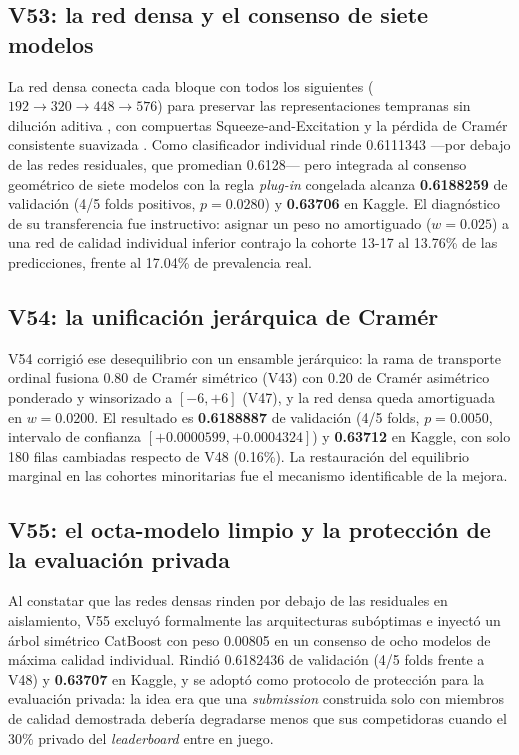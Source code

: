\documentclass[journal]{IEEEtai}
\begin{document}
\subsection{V53: la red densa y el consenso de siete modelos}

La red densa conecta cada bloque con todos los siguientes ($192 \to 320 \to 448 \to 576$) para preservar las representaciones tempranas sin diluci\'on aditiva \cite{huang2017}, con compuertas Squeeze-and-Excitation \cite{hu2018} y la p\'erdida de Cram\'er consistente suavizada \cite{cramer1928,szekely2013}. Como clasificador individual rinde 0.6111343 ---por debajo de las redes residuales, que promedian 0.6128--- pero integrada al consenso geom\'etrico de siete modelos con la regla \textit{plug-in} congelada alcanza \textbf{0.6188259} de validaci\'on (4/5 folds positivos, $p = 0.0280$) y \textbf{0.63706} en Kaggle. El diagn\'ostico de su transferencia fue instructivo: asignar un peso no amortiguado ($w = 0.025$) a una red de calidad individual inferior contrajo la cohorte 13-17 al 13.76\% de las predicciones, frente al 17.04\% de prevalencia real.

\subsection{V54: la unificaci\'on jer\'arquica de Cram\'er}

V54 corrigi\'o ese desequilibrio con un ensamble jer\'arquico: la rama de transporte ordinal fusiona 0.80 de Cram\'er sim\'etrico (V43) con 0.20 de Cram\'er asim\'etrico ponderado y winsorizado a $[-6, +6]$ (V47), y la red densa queda amortiguada en $w = 0.0200$. El resultado es \textbf{0.6188887} de validaci\'on (4/5 folds, $p = 0.0050$, intervalo de confianza $[+0.0000599, +0.0004324]$) y \textbf{0.63712} en Kaggle, con solo 180 filas cambiadas respecto de V48 (0.16\%). La restauraci\'on del equilibrio marginal en las cohortes minoritarias fue el mecanismo identificable de la mejora.

\subsection{V55: el octa-modelo limpio y la protecci\'on de la evaluaci\'on privada}

Al constatar que las redes densas rinden por debajo de las residuales en aislamiento, V55 excluy\'o formalmente las arquitecturas sub\'optimas e inyect\'o un \'arbol sim\'etrico CatBoost con peso 0.00805 \cite{prokhorenkova2018} en un consenso de ocho modelos de m\'axima calidad individual. Rindi\'o 0.6182436 de validaci\'on (4/5 folds frente a V48) y \textbf{0.63707} en Kaggle, y se adopt\'o como protocolo de protecci\'on para la evaluaci\'on privada: la idea era que una \textit{submission} construida solo con miembros de calidad demostrada deber\'ia degradarse menos que sus competidoras cuando el 30\% privado del \textit{leaderboard} entre en juego.
\end{document}
